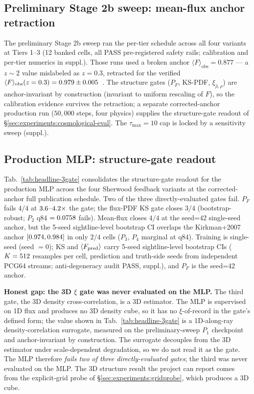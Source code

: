 \subsection{Preliminary Stage 2b sweep: mean-flux anchor retraction}
\label{sec:experiments:prelim-sweep}
The preliminary Stage 2b sweep ran the per-tier schedule across all four variants at Tiers 1--3 (12 banked cells, all PASS pre-registered safety rails; calibration and per-tier numerics in suppl.). Those runs used a broken anchor $\langle F\rangle_{\text{obs}} = 0.877$ --- a $z\!\sim\!2$ value mislabeled as $z=0.3$, retracted for the verified $\langle F\rangle_{\text{obs}}(z=0.3) = 0.979 \pm 0.005$~\cite{kirkman2007}. The structure gates ($P_F$, KS-PDF, $\xi_{\hat\rho,\rho}$) are anchor-invariant by construction (invariant to uniform rescaling of $\hat F$), so the calibration evidence survives the retraction; a separate corrected-anchor production run ($50{,}000$ steps, four physics) supplies the structure-gate readout of \S\ref{sec:experiments:cosmological-eval}. The $\tau_{\max}=10$ cap is locked by a sensitivity sweep (suppl.).

\subsection{Production MLP: structure-gate readout}
\label{sec:experiments:headline}
Tab.~\ref{tab:headline-3gate} consolidates the structure-gate readout for the production MLP across the four Sherwood feedback variants at the corrected-anchor full publication schedule. Two of the three directly-evaluated gates fail. $P_F$ fails $4/4$ at $3.6$--$4.2\times$ the gate; the flux-PDF KS gate closes $3/4$ (bootstrap-robust; $P_2$ q84 $=0.0758$ fails). Mean-flux closes $4/4$ at the seed=42 single-seed anchor, but the 5-seed sightline-level bootstrap CI overlaps the Kirkman+2007 anchor $[0.974, 0.984]$ in only $2/4$ cells ($P_3$, $P_4$ marginal at q84). Training is single-seed (seed $=0$); KS and $\langle F_{\rm pred}\rangle$ carry 5-seed sightline-level bootstrap CIs ($K=512$ resamples per cell, prediction and truth-side seeds from independent PCG64 streams; anti-degeneracy audit PASS, suppl.), and $P_F$ is the seed=42 anchor.

\textbf{Honest gap: the 3D $\xi$ gate was never evaluated on the MLP.} The third gate, the 3D density cross-correlation, is a 3D estimator. The MLP is supervised on 1D flux and produces no 3D density cube, so it has no $\xi$-of-record in the gate's defined form; the value shown in Tab.~\ref{tab:headline-3gate} is a 1D-along-ray density-correlation surrogate, measured on the preliminary-sweep $P_1$ checkpoint and anchor-invariant by construction. The surrogate decouples from the 3D estimator under scale-dependent degradation, so we do not read it as the gate. The MLP therefore \emph{fails two of three directly-evaluated gates}; the third was never evaluated on the MLP. The 3D structure result the project can report comes from the explicit-grid probe of \S\ref{sec:experiments:gridprobe}, which produces a 3D cube.

